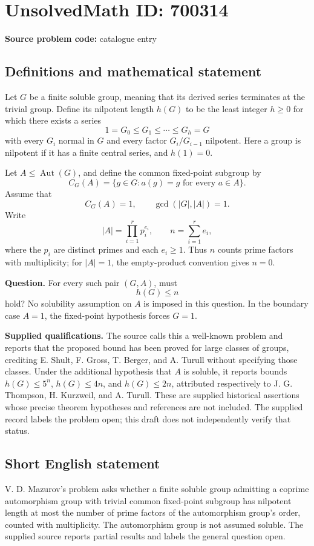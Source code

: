 \documentclass[11pt]{article}
\begin{document}
\section*{UnsolvedMath ID: 700314}
\textbf{Source problem code:} catalogue entry
\subsection{Definitions and mathematical statement}
Let \(G\) be a finite soluble group, meaning that its derived series terminates at the trivial group. Define its nilpotent length \(h(G)\) to be the least integer \(h\geq 0\) for which there exists a series
\[
1=G_0\leq G_1\leq\cdots\leq G_h=G
\]
with every \(G_i\) normal in \(G\) and every factor \(G_i/G_{i-1}\) nilpotent. Here a group is nilpotent if it has a finite central series, and \(h(1)=0\).

Let \(A\leq\operatorname{Aut}(G)\), and define the common fixed-point subgroup by
\[
C_G(A)=\{g\in G: a(g)=g\text{ for every }a\in A\}.
\]
Assume that
\[
C_G(A)=1,\qquad \gcd(|G|,|A|)=1.
\]
Write
\[
|A|=\prod_{i=1}^{r}p_i^{e_i},\qquad n=\sum_{i=1}^{r}e_i,
\]
where the \(p_i\) are distinct primes and each \(e_i\geq 1\). Thus \(n\) counts prime factors with multiplicity; for \(|A|=1\), the empty-product convention gives \(n=0\).

\textbf{Question.} For every such pair \((G,A)\), must
\[
h(G)\leq n
\]
hold? No solubility assumption on \(A\) is imposed in this question. In the boundary case \(A=1\), the fixed-point hypothesis forces \(G=1\).

\textbf{Supplied qualifications.} The source calls this a well-known problem and reports that the proposed bound has been proved for large classes of groups, crediting E. Shult, F. Gross, T. Berger, and A. Turull without specifying those classes. Under the additional hypothesis that \(A\) is soluble, it reports bounds \(h(G)\leq 5^n\), \(h(G)\leq 4n\), and \(h(G)\leq 2n\), attributed respectively to J. G. Thompson, H. Kurzweil, and A. Turull. These are supplied historical assertions whose precise theorem hypotheses and references are not included. The supplied record labels the problem open; this draft does not independently verify that status.
\subsection{Short English statement}
V. D. Mazurov's problem asks whether a finite soluble group admitting a coprime automorphism group with trivial common fixed-point subgroup has nilpotent length at most the number of prime factors of the automorphism group's order, counted with multiplicity. The automorphism group is not assumed soluble. The supplied source reports partial results and labels the general question open.
\end{document}

